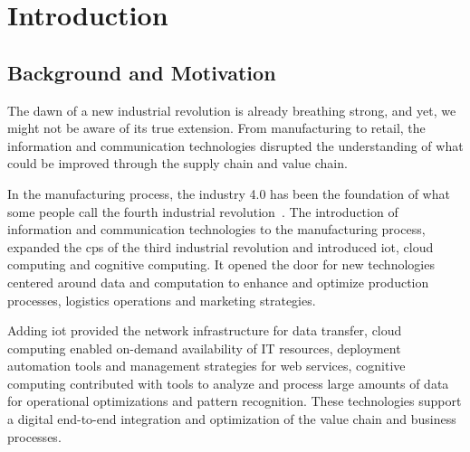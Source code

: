 
\chapter{Introduction}

\section{Background and Motivation}

The dawn of a new industrial revolution is already breathing strong, and yet, we might not be aware of its true extension.
From manufacturing to retail, the information and communication technologies disrupted the understanding of what could be improved through the \gls{supply chain} and \gls{value chain}. 

In the manufacturing process, the \gls{industry 4.0} has been the foundation of what some people call the fourth industrial revolution~\cite{marrWhatIndustryHere}. 
The introduction of information and communication technologies to the manufacturing process, expanded the \gls{cps} of the third industrial revolution and introduced \gls{iot}, \gls{cloud computing} and \gls{cognitive computing}. 
It opened the door for new technologies centered around data and computation to enhance and optimize production processes, logistics operations and marketing strategies.

Adding \gls{iot} provided the network infrastructure for data transfer, \gls{cloud computing} enabled on-demand availability of \gls{IT} resources, deployment automation tools and management strategies for \gls{web services}, \gls{cognitive computing} contributed with tools to analyze and process large amounts of data for operational optimizations and pattern recognition.
These technologies support a digital end-to-end integration and optimization of the \gls{value chain} and \gls{business processes}. 

